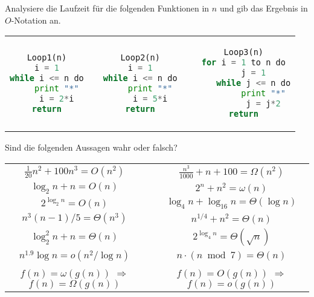 \documentclass{uebung_cs}
\begin{document}
\begin{aufgabe}
	Analysiere die Laufzeit für die folgenden Funktionen in $n$ und gib das Ergebnis in $O$-Notation an.
	\begin{center}
		\begin{tabular}{ccccc}

\begin{lstlisting}[language=Python]
Loop1(n)
i = 1
while i <= n do
	print "*"
	i = 2*i
return
\end{lstlisting}		
		
			&\mbox{}\hspace{2cm}\mbox{}&

\begin{lstlisting}[language=Python]
Loop2(n)
i = 1
while i <= n do
	print "*"
	i = 5*i
return
\end{lstlisting}

			
			&\mbox{}\hspace{2cm}\mbox{}&
			
\begin{lstlisting}[language=Python]
Loop3(n)
for i = 1 to n do
	j = 1
	while j <= n do
		print "*"
		j = j*2
return
\end{lstlisting}
		\end{tabular}
	\end{center}
\end{aufgabe}

\begin{aufgabe}
	Sind die folgenden Aussagen wahr oder falsch?
	\begin{center}
		\begin{tabular}{ccc}
			$\frac{1}{20}n^2 + 100 n^3 = O(n^2)$
			&\mbox{}\hspace{2cm}\mbox{}&
			$\frac{n^3}{1000} + n + 100 = \Omega(n^2)$\\
			$\log_2 n + n = O(n)$&&
			$2^n + n^2 = \omega(n)$\\
			$2^{\log_2 n} = O(n)$&&
			$\log_4 n + \log_{16} n = \Theta(\log n)$\\
			$n^3(n-1)/5 = \Theta(n^3)$&&
			$n^{1/4} + n^2 = \Theta(n)$\\
			$\log_2^2n + n = \Theta(n)$&&
			$2^{\log_4n} = \Theta(\sqrt{n})$\\
			$n^{1.9}\log n = o(n^2/\log n)$&&
			$n\cdot(n\bmod 7) = \Theta(n)$\\
			$f(n)=\omega(g(n))$
			$\Longrightarrow$
			$f(n)=\Omega(g(n))$&&
			$f(n)=O(g(n))$
			$\Longrightarrow$
			$f(n)=o(g(n))$
		\end{tabular}
	\end{center}
\end{aufgabe}
\end{document}
